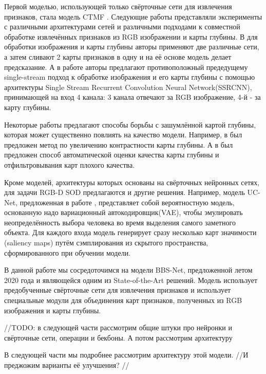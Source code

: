 Первой моделью, использующей только свёрточные сети для извлечения признаков, стала модель CTMF \cite{CNNs-Based}. 
Следующие работы представляли эксперименты с различными архитектурами сетей и различными подходами 
к совместной обработке извлечённых признаков из RGB изображении и карты глубины. В \cite{Progressively} для обработки 
изображения и карты глубины авторы применяют две различные сети, а затем сливают 2 карты признаков в одну и 
на её основе модель делает предсказание. А в работе \cite{Single-Stream} авторы предлагают противоположный предедущему 
single-stream подход к обработке изображения и его карты глубины с помощью архитектуры Single Stream Recurrent Convolution Neural Network(SSRCNN),
принимающей на вход 4 канала: 3 канала отвечают за RGB изображение, 4-й - за карту глубины.

Некоторые работы предлагают способы борьбы с зашумлённой картой глубины, которая может существенно повлиять на качество модели.
Например, в \cite{Contrast} был предложен метод по увеличению контрастности карты глубины. А в \cite{Rethinking-RGBD} был предложен 
способ автоматической оценки качества карты глубины и отфильтровывания карт плохого качества.

Кроме моделей, архитектуры которых основаны на свёрточных нейронных сетях, для задачи RGB-D SOD предлагаются и другие решения. 
Например, модель UC-Net, предложенная в работе \cite{UC-Net}, представляет собой вероятностную модель, основанную надо
 вариационный автокодировщик(VAE), чтобы эмулировать неопределённость выбора человека во время выделения самого заметного объекта.
Для каждого входа модель генерирует сразу несколько карт значимости (saliency maps) путём сэмплирования из скрытого пространства,
сформированного при обучении модели.


В данной работе мы сосредоточимся на модели BBS-Net\cite{BBS}, предложенной летом 2020 года и являющейся одним из State-of-the-Art решений.
Модель использует предобученные свёрточные сети для извлечения признаков и использует специальные модули для объединения карт признаков,
полученных из RGB изображения и карты глубины. 


//TODO: в следующей части рассмотрим общие штуки про нейронки и свёрточные сети, операции и бекбоны. А потом рассмотрим архитектуру

В следующей части мы подробнее рассмотрим архитектуру этой модели. //И преджожим варианты
её улучшения? //